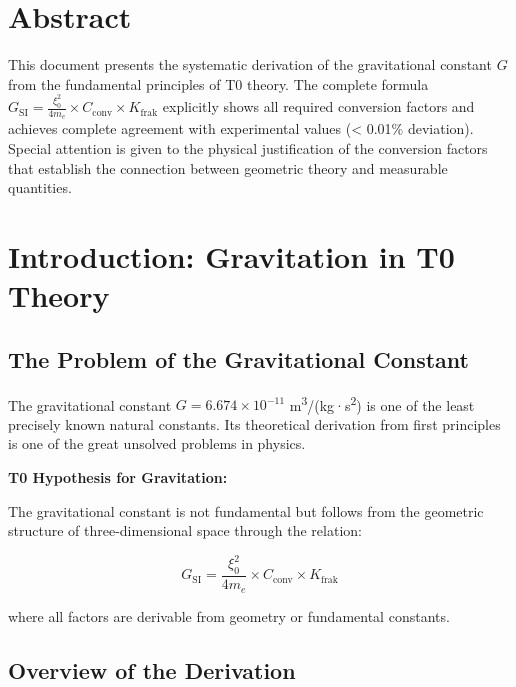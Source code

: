 \section*{Abstract}
		This document presents the systematic derivation of the gravitational constant $G$ from the fundamental principles of T0 theory. The complete formula $G_{\text{SI}} = \frac{\xi_0^2}{4 m_e} \times C_{\text{conv}} \times K_{\text{frak}}$ explicitly shows all required conversion factors and achieves complete agreement with experimental values (< 0.01\% deviation). Special attention is given to the physical justification of the conversion factors that establish the connection between geometric theory and measurable quantities.

	
	
	\section{Introduction: Gravitation in T0 Theory}
	
	\subsection{The Problem of the Gravitational Constant}
	
	The gravitational constant $G = 6.674 \times 10^{-11}$ m\textsuperscript{3}/(kg·s\textsuperscript{2}) is one of the least precisely known natural constants. Its theoretical derivation from first principles is one of the great unsolved problems in physics.
	
	\begin{keyresult}
		\textbf{T0 Hypothesis for Gravitation:}
		
		The gravitational constant is not fundamental but follows from the geometric structure of three-dimensional space through the relation:
		
		\begin{equation}
			\boxed{G_{\text{SI}} = \frac{\xi_0^2}{4 m_e} \times C_{\text{conv}} \times K_{\text{frak}}}
			\label{eq:G_complete}
		\end{equation}
		
		where all factors are derivable from geometry or fundamental constants.
	\end{keyresult}
	
	\subsection{Overview of the Derivation}
	
